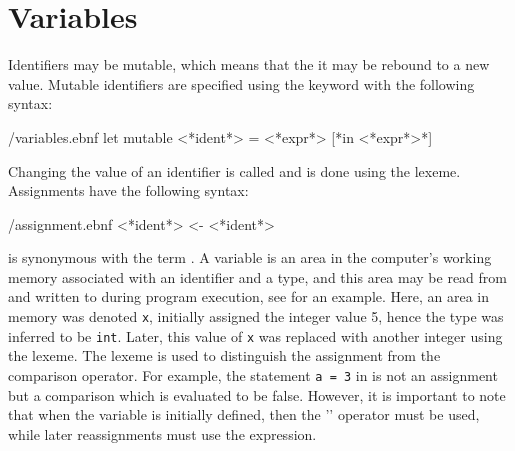 \documentclass[fsharpnotes.tex]{subfiles}
\begin{document}
\section{Variables}
\label{sec:mutableValues}
Identifiers may be mutable, which means that the it may be rebound to a new value. Mutable identifiers are specified using the  keyword with the following syntax:
%
\begin{verbatimwrite}{\ebnf/variables.ebnf}
let mutable <*ident*> = <*expr*> [*in <*expr*>*]
\end{verbatimwrite}
%
Changing the value of an identifier is called  and is done using the \idx[{<-}@\lstinline{<-}]{\lexeme{<-}} lexeme. Assignments have the following syntax:
%
\begin{verbatimwrite}{\ebnf/assignment.ebnf}
<*ident*> <- <*ident*>
\end{verbatimwrite}
%
 is synonymous with the term . A variable is an area in the computer's working memory associated with an identifier and a type, and this area may be read from and written to during program execution, see  for an example.
%
%
Here, an area in memory was denoted \lstinline{x}, initially assigned the integer value 5, hence the type was inferred to be \lstinline|int|.  Later, this value of \lstinline{x} was replaced with another integer using the \lexeme{<-} lexeme. The \lexeme{<-} lexeme is used to distinguish the assignment from the comparison operator. For example, the statement \lstinline{a = 3} in  is not an assignment but a comparison which is evaluated to be false. 
%
%
%
However, it is important to note that when the variable is initially defined, then the '\lexeme{=}' operator must be used, while later reassignments must use the \lexeme{<-} expression.
\end{document}
